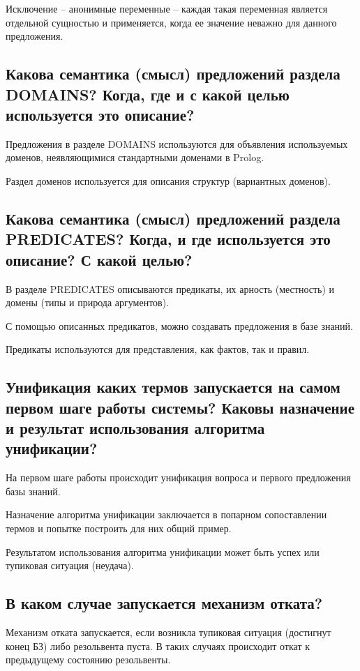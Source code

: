 \documentclass[a4paper,12pt]{article}
\begin{document}
	Исключение – анонимные переменные – каждая такая переменная является отдельной сущностью и применяется, когда ее значение неважно для данного предложения.
	
	\subsection*{Какова семантика (смысл) предложений раздела DOMAINS?  Когда, где и с какой целью используется это описание?}
	
	Предложения в разделе DOMAINS используются для объявления используемых доменов, неявляющимися стандартными доменами в Prolog. 
	
	Раздел доменов используется для описания структур (вариантных доменов).
	
	\subsection*{Какова семантика (смысл) предложений раздела PREDICATES? Когда, и где используется это описание? С какой целью?}
	
	В разделе PREDICATES описываются предикаты, их арность (местность) и домены (типы и природа аргументов).
	
	 С помощью описанных предикатов, можно создавать предложения в базе знаний. 
	 
	 Предикаты используются для представления, как фактов, так и правил.
	
	\subsection*{Унификация каких термов запускается на самом первом шаге работы системы? Каковы назначение и результат использования алгоритма унификации?}
	
	На первом шаге работы происходит унификация вопроса и первого предложения базы знаний.
	
	Назначение алгоритма унификации заключается в попарном сопоставлении термов и попытке построить для них общий пример. 
	
	Результатом использования алгоритма унификации может быть успех или тупиковая ситуация (неудача).
	
	\subsection*{В каком случае запускается механизм отката?}
	
	Механизм отката запускается, если возникла тупиковая ситуация (достигнут конец БЗ) либо резольвента пуста. В таких случаях происходит откат к предыдущему состоянию резольвенты.
	
\end{document}

